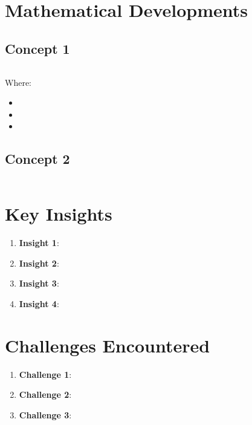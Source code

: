 \documentclass{article}
\begin{document}
\section{Mathematical Developments}

\subsection{Concept 1}
\begin{equation}
\end{equation}

Where:
\begin{itemize}
  \item 
  \item 
  \item 
\end{itemize}

\subsection{Concept 2}
\begin{equation}
\end{equation}

\section{Key Insights}
\begin{enumerate}
  \item \textbf{Insight 1}: 
  \item \textbf{Insight 2}: 
  \item \textbf{Insight 3}: 
  \item \textbf{Insight 4}: 
\end{enumerate}

\section{Challenges Encountered}
\begin{enumerate}
  \item \textbf{Challenge 1}: 
  \item \textbf{Challenge 2}: 
  \item \textbf{Challenge 3}: 
\end{enumerate}
\end{document}
